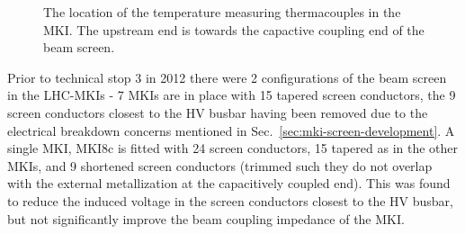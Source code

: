 \begin{figure}
\label{fig:mki-thermacouple-location}
\caption{The location of the temperature measuring thermacouples in the MKI. The upstream end is towards the capactive coupling end of the beam screen.}
\end{figure}

Prior to technical stop 3 in 2012 there were 2 configurations of the beam screen in the LHC-MKIs - 7 MKIs are in place with 15 tapered screen conductors, the 9 screen conductors closest to the HV busbar having been removed due to the electrical breakdown concerns mentioned in Sec.~\ref{sec:mki-screen-development}. A single MKI, MKI8c is fitted with 24 screen conductors, 15 tapered as in the other MKIs, and 9 shortened screen conductors (trimmed such they do not overlap with the external metallization at the capacitively coupled end). This was found to reduce the induced voltage in the screen conductors closest to the HV busbar, but not significantly improve the beam coupling impedance of the MKI.